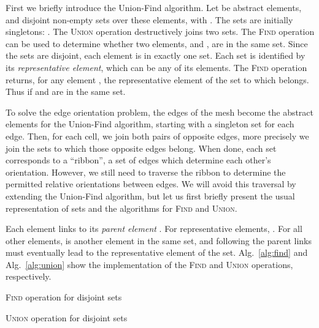 \documentclass[oneeqnum,onethmnum,onefignum,onetabnum]{siamltex1213}
\begin{document}
First we briefly introduce the Union-Find algorithm. Let  be abstract elements, and 
disjoint non-empty sets over these elements, with . The sets are
initially singletons: .
The \textsc{Union} operation destructively joins two sets.
The \textsc{Find} operation can be used to determine whether two elements,
 and , are in the same set.
Since the sets are disjoint, each element is in exactly one set.
Each set is identified by its \emph{representative element}, which can
be any of its elements.
The \textsc{Find} operation returns, for any element , the
representative element of the set to which  belongs.
Thus  if 
and  are in the same set.

To solve the edge orientation problem, the edges of the mesh become the
abstract elements for the Union-Find algorithm, starting with a singleton
set for each edge. Then, for each cell, we join both pairs of opposite
edges, more precisely we join the sets to which those opposite edges
belong. When done, each set corresponds to a ``ribbon'', a set of edges
which determine each other's orientation.  However, we still need to
traverse the ribbon to determine the permitted relative orientations between
edges.  We will avoid this traversal by extending the Union-Find algorithm,
but let us first briefly present the usual representation of sets and the
algorithms for \textsc{Find} and \textsc{Union}.

Each element  links to its \emph{parent element} .
For representative elements, .
For all other elements,  is another element in the same set,
and following the parent links must eventually lead to the
representative element of the set.
Alg.~\ref{alg:find} and Alg.~\ref{alg:union} show the implementation of the
\textsc{Find} and \textsc{Union} operations, respectively.

\begin{algorithm}
  \caption{\textsc{Find} operation for disjoint sets}
  \label{alg:find}
  \begin{algorithmic}[1]
    \If {}
      \State \Return 
    \Else
      \State \Return {}
    \EndIf
    \EndFunction
  \end{algorithmic}
\end{algorithm}

\begin{algorithm}
  \caption{\textsc{Union} operation for disjoint sets}
  \label{alg:union}
  \begin{algorithmic}[1]
    \State  {}
    \State  {}
    \If {}
      \State 
    \EndIf
    \EndProcedure
  \end{algorithmic}
\end{algorithm}
\end{document}
